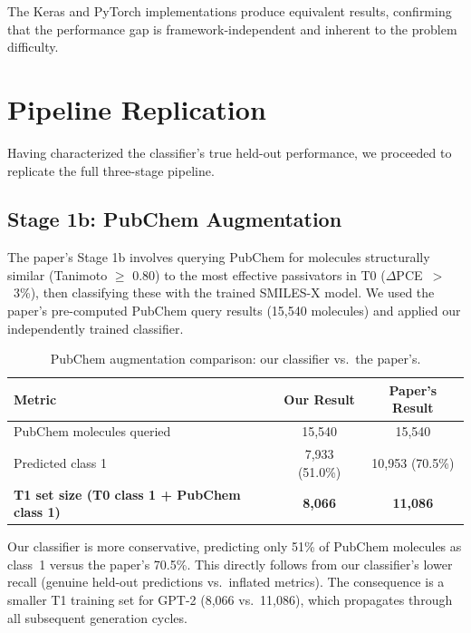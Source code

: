 \documentclass[11pt,a4paper]{article}
\begin{document}
The Keras and PyTorch implementations produce equivalent results, confirming that the performance gap is framework-independent and inherent to the problem difficulty.

\section{Pipeline Replication}
\label{sec:pipeline}

Having characterized the classifier's true held-out performance, we proceeded to replicate the full three-stage pipeline.

\subsection{Stage 1b: PubChem Augmentation}
\label{sec:pubchem}

The paper's Stage 1b involves querying PubChem for molecules structurally similar (Tanimoto $\geq$ 0.80) to the most effective passivators in T0 ($\Delta$PCE~$>$~3\%), then classifying these with the trained SMILES-X model. We used the paper's pre-computed PubChem query results (15,540 molecules) and applied our independently trained classifier.

\begin{table}[H]
\centering
\caption{PubChem augmentation comparison: our classifier vs.\ the paper's.}
\label{tab:pubchem}
\begin{tabular}{lcc}
\toprule
Metric & Our Result & Paper's Result \\
\midrule
PubChem molecules queried & 15,540 & 15,540 \\
Predicted class 1 & 7,933 (51.0\%) & 10,953 (70.5\%) \\
\midrule
\textbf{T1 set size (T0 class 1 + PubChem class 1)} & \textbf{8,066} & \textbf{11,086} \\
\bottomrule
\end{tabular}
\end{table}

Our classifier is more conservative, predicting only 51\% of PubChem molecules as class~1 versus the paper's 70.5\%. This directly follows from our classifier's lower recall (genuine held-out predictions vs.\ inflated metrics). The consequence is a smaller T1 training set for GPT-2 (8,066 vs.\ 11,086), which propagates through all subsequent generation cycles.
\end{document}
